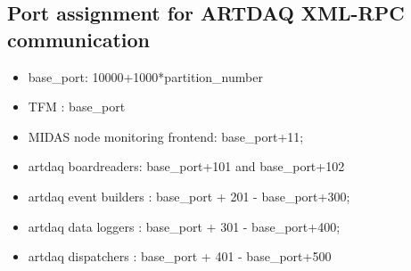 \subsection{Port assignment for ARTDAQ XML-RPC communication}
\begin{itemize}
\item
  base\_port: 10000+1000*partition\_number
\item 
  TFM : base\_port
\item 
  MIDAS node monitoring frontend: base\_port+11;
\item 
  artdaq boardreaders: base\_port+101 and base\_port+102
\item 
  artdaq event builders : base\_port + 201 - base\_port+300;
\item 
  artdaq data loggers  : base\_port + 301 - base\_port+400;
\item 
  artdaq dispatchers : base\_port + 401 - base\_port+500
\end{itemize}




